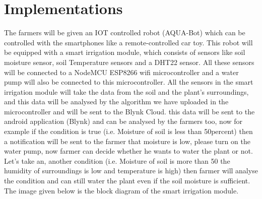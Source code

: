 \documentclass[dvips,12pt]{article}
\begin{document}
\section*{Implementations}
The farmers will be given an IOT controlled robot (AQUA-Bot) which can be controlled with the
smartphones like a remote-controlled car toy. This robot will be equipped with a smart irrigation module,
which consists of sensors like soil moisture sensor, soil Temperature sensors and a DHT22 sensor. All these
sensors will be connected to a NodeMCU ESP8266 wifi microcontroller and a water pump will also be
connected to this microcontroller.
All the sensors in the smart irrigation module will take the data from the soil and the plant’s surroundings,
and this data will be analysed by the algorithm we have uploaded in the microcontroller and will be sent to
the Blynk Cloud. this data will be sent to the android application (Blynk) and can be analysed by the farmers
too, now for example if the condition is true (i.e. Moisture of soil is less than 50percent) then a notification will be
sent to the farmer that moisture is low, please turn on the water pump, now farmer can decide whether he
wants to water the plant or not. Let’s take an, another condition (i.e. Moisture of soil is more than 50%
the humidity of surroundings is low and temperature is high) then farmer will analyse the condition and can
still water the plant even if the soil moisture is sufficient.
The image given below is the block diagram of the smart irrigation module.

\begin{center}
\end{center}
\end{document}
